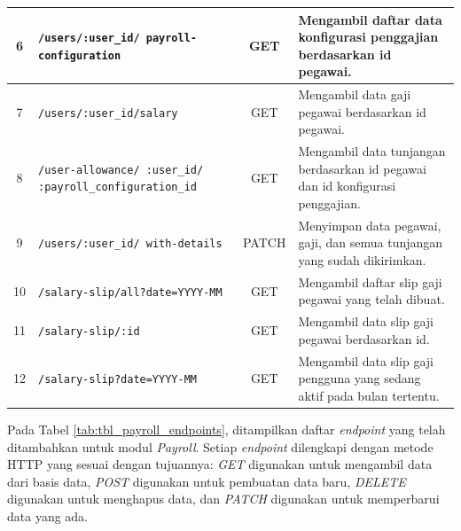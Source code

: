 \begin{center}
\begin{longtable}{|c|p{}|c|p{}|}
    6 & \texttt{/users/{:user\_id}/ payroll-configuration} & GET & Mengambil daftar data konfigurasi penggajian berdasarkan id pegawai. \\ \hline
    7 & \texttt{/users/{:user\_id}/salary} & GET & Mengambil data gaji pegawai berdasarkan id pegawai. \\ \hline
    8 & \texttt{/user-allowance/ {:user\_id}/ {:payroll\_configuration\_id}} & GET & Mengambil data tunjangan berdasarkan id pegawai dan id konfigurasi penggajian. \\ \hline
    9 & \texttt{/users/{:user\_id}/ with-details} & PATCH & Menyimpan data pegawai, gaji, dan semua tunjangan yang sudah dikirimkan. \\ \hline
    10 & \texttt{/salary-slip/all?date=YYYY-MM} & GET & Mengambil daftar slip gaji pegawai yang telah dibuat. \\ \hline
    11 & \texttt{/salary-slip/{:id}} & GET & Mengambil data slip gaji pegawai berdasarkan id. \\ \hline
    12 & \texttt{/salary-slip?date=YYYY-MM} & GET & Mengambil data slip gaji pengguna yang sedang aktif pada bulan tertentu. \\ \hline
    \end{longtable}
\end{center}

Pada Tabel \ref{tab:tbl_payroll_endpoints}, ditampilkan daftar \textit{endpoint} yang telah ditambahkan untuk modul \textit{Payroll}. Setiap \textit{endpoint} dilengkapi dengan metode HTTP yang sesuai dengan tujuannya: \textit{GET} digunakan untuk mengambil data dari basis data, \textit{POST} digunakan untuk pembuatan data baru, \textit{DELETE} digunakan untuk menghapus data, dan \textit{PATCH} digunakan untuk memperbarui data yang ada.

